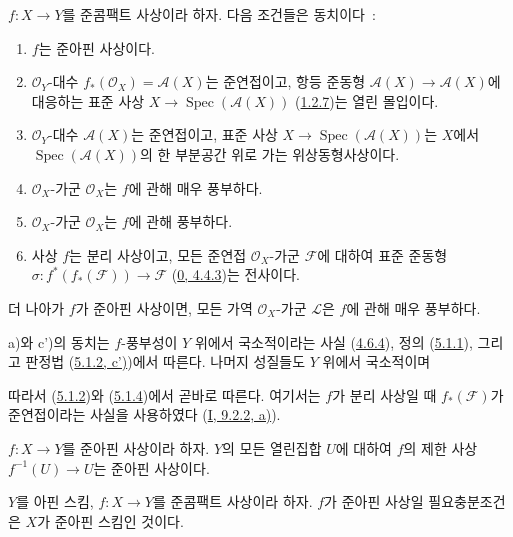 \begin{proposition}[5.1.6]
\label{II.5.1.6-ko}
$f:X\to Y$를 준콤팩트 사상이라 하자. 다음 조건들은 동치이다~:
\begin{enumerate}
  \item[\rm{a)}] $f$는 준아핀 사상이다.
  \item[\rm{b)}] $\mathcal{O}_Y$-대수
  $f_*(\mathcal{O}_X)=\mathcal{A}(X)$는 준연접이고, 항등 준동형
  $\mathcal{A}(X)\to\mathcal{A}(X)$에 대응하는 표준 사상
  $X\to\operatorname{Spec}(\mathcal{A}(X))$
  (\hyperref[II.1.2.7-ko]{1.2.7})는 열린 몰입이다.
  \item[\rm{b')}] $\mathcal{O}_Y$-대수 $\mathcal{A}(X)$는
  준연접이고, 표준 사상 $X\to\operatorname{Spec}(\mathcal{A}(X))$는
  $X$에서 $\operatorname{Spec}(\mathcal{A}(X))$의 한 부분공간 위로
  가는 위상동형사상이다.
  \item[\rm{c)}] $\mathcal{O}_X$-가군 $\mathcal{O}_X$는
  $f$에 관해 매우 풍부하다.
  \item[\rm{c')}] $\mathcal{O}_X$-가군 $\mathcal{O}_X$는
  $f$에 관해 풍부하다.
  \item[\rm{d)}] 사상 $f$는 분리 사상이고, 모든 준연접
  $\mathcal{O}_X$-가군 $\mathcal{F}$에 대하여 표준 준동형
  $\sigma:f^*(f_*(\mathcal{F}))\to\mathcal{F}$
  (\hyperref[0.4.4.3-ko]{0, 4.4.3})는 전사이다.
\end{enumerate}
더 나아가 $f$가 준아핀 사상이면, 모든 가역 $\mathcal{O}_X$-가군
$\mathcal{L}$은 $f$에 관해 매우 풍부하다.
\end{proposition}

a)와 c')의 동치는 $f$-풍부성이 $Y$ 위에서 국소적이라는 사실
(\hyperref[II.4.6.4-ko]{4.6.4}), 정의
(\hyperref[II.5.1.1-ko]{5.1.1}), 그리고 판정법
(\hyperref[II.5.1.2-ko]{5.1.2, c')})에서 따른다. 나머지 성질들도
$Y$ 위에서 국소적이며


따라서 (\hyperref[II.5.1.2-ko]{5.1.2})와
(\hyperref[II.5.1.4-ko]{5.1.4})에서 곧바로 따른다. 여기서는 $f$가
분리 사상일 때 $f_*(\mathcal{F})$가 준연접이라는 사실을 사용하였다
(\hyperref[I.9.2.2-ko]{I, 9.2.2, a)}).

\begin{corollary}[5.1.7]
\label{II.5.1.7-ko}
$f:X\to Y$를 준아핀 사상이라 하자. $Y$의 모든 열린집합 $U$에
대하여 $f$의 제한 사상 $f^{-1}(U)\to U$는 준아핀 사상이다.
\end{corollary}

\begin{corollary}[5.1.8]
\label{II.5.1.8-ko}
$Y$를 아핀 스킴, $f:X\to Y$를 준콤팩트 사상이라 하자. $f$가
준아핀 사상일 필요충분조건은 $X$가 준아핀 스킴인 것이다.
\end{corollary}

